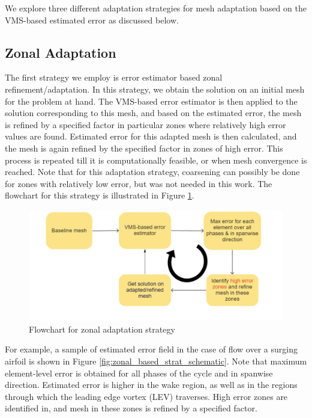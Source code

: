 We explore three different adaptation strategies for mesh adaptation based on the VMS-based estimated error as discussed below. 

\subsection{Zonal Adaptation}



The first strategy we employ is error estimator based zonal refinement/adaptation. 
In this strategy, we obtain the solution on an initial mesh for the problem at hand. The VMS-based error estimator is then applied to the solution corresponding to this mesh, and based on the estimated error, the mesh is refined by a specified factor in particular zones where relatively high error values are found. Estimated error for this adapted mesh is then calculated, and the mesh is again refined by the specified factor in zones of high error. This process is repeated till it is computationally feasible, or when mesh convergence is reached.
Note that for this adaptation strategy, coarsening can possibly be done for zones with relatively low error, but was not needed in this work. The flowchart for this strategy is illustrated in Figure \ref{fig:zonal_based_strat}.

\begin{figure}[H]
	\centering
	\includegraphics[width=1\textwidth]{figures/adapt_strat/zonal_based.png}
	\caption{Flowchart for zonal adaptation strategy}
	\label{fig:zonal_based_strat}
\end{figure}

For example, a sample of estimated error field in the case of flow over a surging airfoil is shown in Figure \ref{fig:zonal_based_strat_schematic}.
Note that maximum element-level error is obtained for all phases of the cycle and in spanwise direction.
Estimated error is higher in the wake region, as well as in the regions through which the leading edge vortex (LEV) traverses.
High error zones are identified in, and mesh in these zones is refined by a specified factor.

